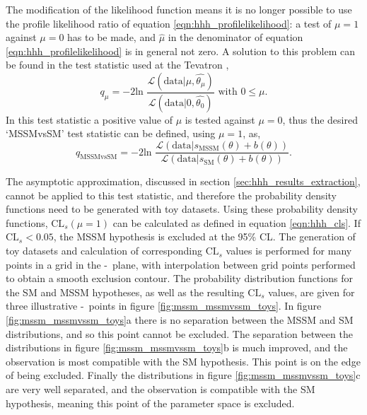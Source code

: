 The modification of the likelihood function means it is no longer possible
to use the profile likelihood ratio of equation \ref{eqn:hhh_profilelikelihood}:
a test of $\mu=1$ against $\mu=0$ has to be made, and 
$\hat{\mu}$ in the denominator of equation \ref{eqn:hhh_profilelikelihood} is in 
general not zero. A solution to this problem can be found in the test statistic used at the Tevatron \cite{LHCHComb2011,TEV-Higgs},
\begin{equation}\label{eqn:mssm_tevatron_teststat}
q_{\mu} = -2\text{ln }\frac{\mathcal{L}(\text{data}|\mu,\hat{\theta_{\mu}})}{\mathcal{L}(\text{data}|0,\hat{\theta_0})} \text{ with } 0\leq\mu.
\end{equation}
In this test statistic a positive value of $\mu$ is tested against $\mu=0$, thus 
the desired `MSSMvsSM' test statistic can be defined, using $\mu=1$, as,
\begin{equation}\label{eqn:mssm_mssmvssm_stat}
q_{\text{MSSMvsSM}} = -2\text{ln }\frac{\mathcal{L}(\text{data}|s_{\text{MSSM}}(\theta) + b(\theta))}{\mathcal{L}(\text{data}|s_{\text{SM}}(\theta)+b(\theta))}.
\end{equation}

The asymptotic approximation, discussed in section \ref{sec:hhh_results_extraction}, cannot be applied
to this test statistic, and therefore the probability density functions need to be generated 
with toy datasets. Using these probability density functions, $\text{CL}_s(\mu=1)$ can be calculated as defined in equation \ref{eqn:hhh_cls}.
If $\text{CL}_s < 0.05$, the \ac{MSSM} hypothesis is excluded at the 95\% CL. The generation of toy datasets and 
calculation of corresponding $\text{CL}_s$ values is performed for many points in a grid in the \mA-\tanb~plane,
with interpolation between grid points performed to obtain a smooth exclusion contour.
The probability distribution functions for the \ac{SM} and \ac{MSSM} hypotheses, as well as the resulting $\text{CL}_s$ values,
are given for three illustrative \mA-\tanb~points in figure \ref{fig:mssm_mssmvssm_toys}. In figure \ref{fig:mssm_mssmvssm_toys}a
there is no separation between the \ac{MSSM} and \ac{SM} distributions, and so this point cannot be excluded. The separation
between the distributions in figure \ref{fig:mssm_mssmvssm_toys}b is much improved, and the observation is most compatible
with the \ac{SM} hypothesis. This point is on the edge of being excluded. Finally the distributions in figure \ref{fig:mssm_mssmvssm_toys}c
are very well separated, and the observation is compatible with the \ac{SM} hypothesis, meaning this point of the parameter space is excluded.

